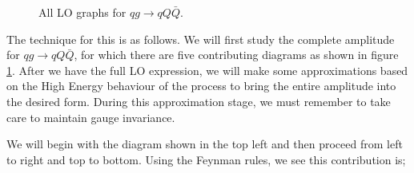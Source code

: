 \begin{figure}[t]
\caption{All LO graphs for $qg \to qQ\bar{Q}$.}
\label{fig:qg_qQQ_graphs}
\end{figure}


The technique for this is as follows. We will first study the complete amplitude for $qg \to qQ\bar{Q}$, for which there are five contributing diagrams as shown in figure \ref{fig:qg_qQQ_graphs}. After we have the full LO expression, we will make some approximations based on the High Energy behaviour of the process to bring the entire amplitude into the desired form. During this approximation stage, we must remember to take care to maintain gauge invariance. 

We will begin with the diagram shown in the top left and then proceed from left to right and top to bottom. Using the Feynman rules, we see this contribution is;

